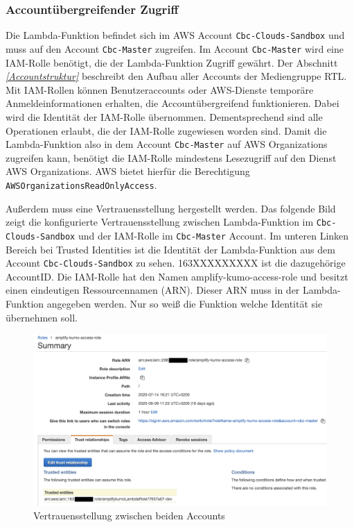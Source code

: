 \subsubsection{Accountübergreifender Zugriff}
\label{AccountübergreifenderZugriff}
Die Lambda-Funktion befindet sich im AWS Account \verb+Cbc-Clouds-Sandbox+ und muss auf den Account \verb+Cbc-Master+ zugreifen.
Im Account \verb+Cbc-Master+ wird eine IAM-Rolle benötigt, die der Lambda-Funktion Zugriff gewährt.
Der Abschnitt  \textit{\ref{Accountstruktur} } beschreibt den Aufbau aller Accounts der Mediengruppe RTL.
Mit IAM-Rollen können Benutzeraccounts oder AWS-Dienste temporäre Anmeldeinformationen erhalten, die Accountübergreifend funktionieren.
Dabei wird die Identität der IAM-Rolle übernommen.
Dementsprechend sind alle Operationen erlaubt, die der IAM-Rolle zugewiesen worden sind.
Damit die Lambda-Funktion also in dem Account \verb+Cbc-Master+ auf AWS Organizations zugreifen kann, benötigt die IAM-Rolle mindestens Lesezugriff auf den Dienst AWS Organizations.
AWS bietet hierfür die Berechtigung \verb+AWSOrganizationsReadOnlyAccess+.

Außerdem muss eine Vertrauensstellung hergestellt werden.
Das folgende Bild zeigt die konfigurierte Vertrauensstellung zwischen Lambda-Funktion im \verb+Cbc-Clouds-Sandbox+ und der IAM-Rolle im \verb+Cbc-Master+ Account.
Im unteren Linken Bereich bei \glqq Trusted Identities\grqq{} ist die Identität der Lambda-Funktion aus dem Account \verb+Cbc-Clouds-Sandbox+ zu sehen.
163XXXXXXXXX ist die dazugehörige AccountID.
Die IAM-Rolle hat den Namen \grqq amplify-kumo-access-role\grqq{} und besitzt einen eindeutigen Ressourcennamen (ARN).
Dieser ARN muss in der Lambda-Funktion angegeben werden. Nur so weiß die Funktion welche Identität sie übernehmen soll.

\clearpage

\begin{figure}[htbp]
    \centering
    \includegraphics[width=1.0\textwidth]{50-Implementierung/IAM-Rolle.png}
    \caption{Vertrauensstellung zwischen beiden Accounts}
    \label{fig:meine-grafik}
\end{figure}


